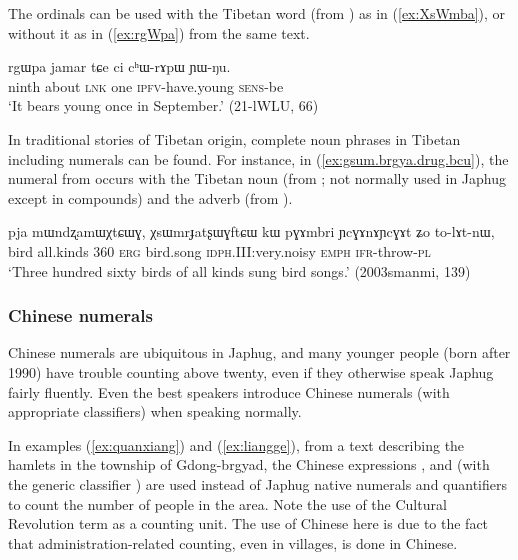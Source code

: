 The ordinals can be used with the Tibetan word  (from ) as in (\ref{ex:XsWmba}), or without it as in (\ref{ex:rgWpa}) from the same text.

\begin{exe}
\ex \label{ex:rgWpa}
\gll  rgɯpa jamar tɕe ci cʰɯ-rɤpɯ ɲɯ-ŋu. \\
ninth about \textsc{lnk} one \textsc{ipfv}-have.young  \textsc{sens}-be \\
\glt `It bears young once in September.' (21-lWLU, 66)
\end{exe}

In traditional stories of Tibetan origin, complete noun phrases in Tibetan including numerals can be found. For instance, in (\ref{ex:gsum.brgya.drug.bcu}), the numeral  from  occurs with the Tibetan noun   (from ; not normally used in Japhug except in compounds) and the adverb  (from ).

\begin{exe}
\ex \label{ex:gsum.brgya.drug.bcu}
\gll pja mɯndʐamɯχtɕɯɣ, χsɯmrɟatʂɯɣftɕɯ kɯ pɣɤmbri ɲcɣɤnɤɲcɣɤt ʑo to-lɤt-nɯ, \\
 bird all.kinds 360 \textsc{erg} bird.song \textsc{idph}.III:very.noisy \textsc{emph} \textsc{ifr}-throw-\textsc{pl} \\
\glt `Three hundred sixty birds of all kinds sung bird songs.' (2003smanmi, 139)
\end{exe}

\subsubsection{Chinese numerals}  \label{sec:chinese.numerals}
Chinese numerals are ubiquitous in Japhug, and many younger people (born after 1990) have trouble counting above twenty, even if they otherwise speak Japhug fairly fluently. Even the best speakers introduce Chinese numerals (with appropriate classifiers) when speaking normally. 

In examples (\ref{ex:quanxiang}) and (\ref{ex:liangge}), from a text describing the hamlets in the township of Gdong-brgyad, the Chinese expressions ,  and  (with the generic classifier ) are used instead of Japhug native numerals and quantifiers to count the number of people in the area. Note the use of the Cultural Revolution term  as a counting unit. The use of Chinese here is due to the fact that administration-related counting, even in villages, is done in Chinese.

